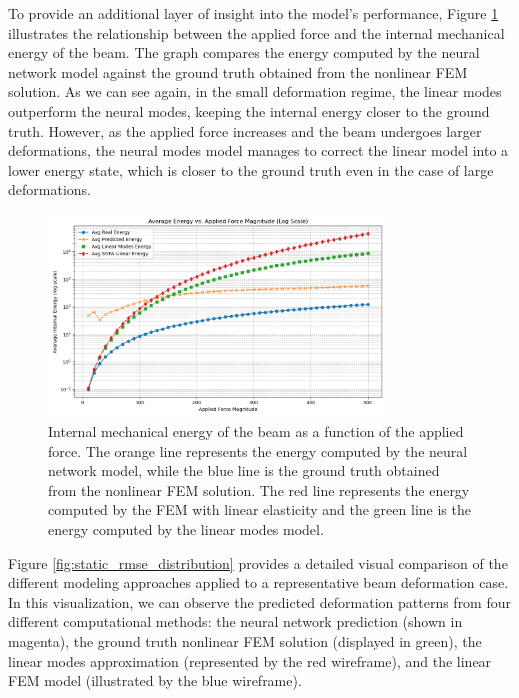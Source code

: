 To provide an additional layer of insight into the model's performance, Figure \ref{fig:static_energy_beam} illustrates the relationship between the applied force and the internal mechanical energy of the beam. The graph compares the energy computed by the neural network model against the ground truth obtained from the nonlinear FEM solution. As we can see again, in the small deformation regime, the linear modes outperform the neural modes, keeping the internal energy closer  to the ground truth. However, as the applied force increases and the beam undergoes larger deformations, the neural modes model manages to correct the linear model into a lower energy state, which is closer to the ground truth even in the case of large deformations. 
\begin{figure}[H]
    \centering
    \includegraphics[width=0.8\textwidth]{Images/beam_static_energy.png}
    \caption{Internal mechanical energy of the beam as a function of the applied force. The orange line represents the energy computed by the neural network model, while the blue line is the ground truth obtained from the nonlinear FEM solution. The red line represents the energy computed by the FEM with linear elasticity and the green line is the energy computed by the linear modes model.}
    \label{fig:static_energy_beam}
\end{figure}


Figure \ref{fig:static_rmse_distribution} provides a detailed visual comparison of the different modeling approaches applied to a representative beam deformation case. In this visualization, we can observe the predicted deformation patterns from four different computational methods: the neural network prediction (shown in magenta), the ground truth nonlinear FEM solution (displayed in green), the linear modes approximation (represented by the red wireframe), and the linear FEM model (illustrated by the blue wireframe). 

